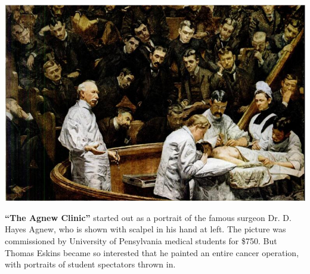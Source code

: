 \documentclass[imperial]{octavo}
\begin{document}
\includegraphics[width=1.0\textwidth]{agnewesclinic}\par
\vspace{-\baselineskip}
\begin{multicols}{3}
\noindent \footnotesize\textbf{``The Agnew Clinic''} started out as a portrait of the famous surgeon Dr. D. Hayes Agnew,  who is shown with scalpel in his hand at left. The picture was commissioned by
University of Pensylvania medical students for \$750. But Thomas Eskins became so interested that he painted an entire cancer operation, with portraits of student spectators thrown in.
\end{multicols}
\end{document}
